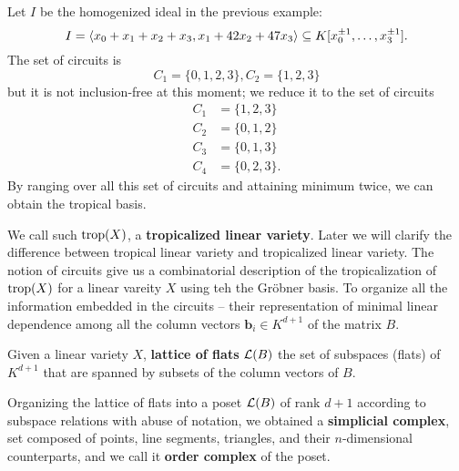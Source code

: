 	\begin{example}
		Let $I$ be the homogenized ideal in the previous example:
		\[
		I = \left< x_0 + x_1 + x_2 + x_3, x_1 + 42x_2 + 47 x_3 \right>
		\subseteq K[x_0^{\pm 1}, \ldots, x_3^{\pm 1}].
		\]
		The set of circuits is 
		\[
		C_1 = \{0, 1, 2, 3\}, C_2 = \{1, 2, 3\}
		\]
		but it is not inclusion-free at this moment;
		we reduce it to the set of circuits
		\begin{align*}
			C_1 &= \{1, 2, 3\} \\
			C_2 &= \{0, 1, 2\} \\
			C_3 &= \{0, 1, 3\} \\
			C_4 &= \{0, 2, 3\}.
		\end{align*}
		By ranging over all this set of circuits and attaining minimum twice, we can obtain the tropical basis. 
	\end{example}

	We call such $\operatorname{trop}(X)$, a \textbf{tropicalized linear variety}.
	Later we will clarify the difference between 
	tropical linear variety and tropicalized linear variety. 
	The notion of circuits give us a combinatorial description 
	of the tropicalization of $\operatorname{trop}(X)$ 
	for a linear vareity $X$
	using teh the Gr\"{o}bner basis.
	To organize all the information embedded in the circuits
	-- their representation of minimal linear dependence 
	among all the column vectors $\mathbf{b}_i \in K^{d+1}$ 
	of the matrix $B$.
	
	\begin{definition}
	\label{def:lattice-of-flats}
		Given a linear variety $X$, 
		\textbf{lattice of flats} $\mathcal{L}(B)$ 
		the set of subspaces (flats) of $K^{d+1}$ 
		that are spanned by subsets of the column vectors of $B$.
	\end{definition}
	
	Organizing the lattice of flats into a poset $\mathcal{L}(B)$ of rank $d+1$
	according to subspace relations with abuse of notation,
	we obtained a \textbf{simplicial complex},
	set composed of points, line segments, triangles, 
	and their $n$-dimensional counterparts,
	and we call it \textbf{order complex} of the poset.
	
